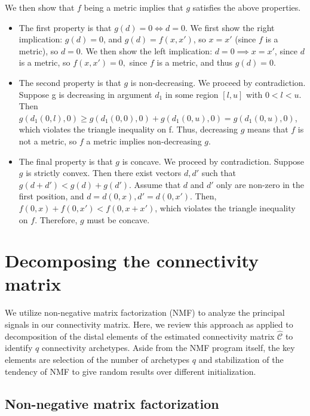 We then show that $f$ being a metric implies that $g$ satisfies the above properties.
\begin{itemize}
    \item The first property is that $g(d) = 0 \Longleftrightarrow d = 0$. We first show the right implication: $g(d) = 0$, and $g(d) = f(x,x')$, so $x = x'$ (since $f$ is a metric), so $d = 0$. We then show the left implication: $d = 0 \implies x = x'$, since $d$ is a metric, so $f(x,x') = 0,$ since $f$ is a metric, and thus $g(d) = 0$.
    \item The second property is that $g$ is non-decreasing. We proceed by contradiction.
    Suppose g is decreasing in argument $d_1$ in some region $[l, u]$ with $0 < l< u$.
    Then $g(d_1(0, l), 0) \geq g(d_1(0, 0), 0) + g(d_1(0, u), 0) = g(d_1(0, u),0)$, which violates the triangle inequality on f. Thus, decreasing $g$ means that $f$ is not a metric, so $f$ a metric implies non-decreasing $g$.
    \item The final property is that $g$ is concave. We proceed by contradiction. Suppose $g$ is strictly convex. Then there exist vectors $d, d'$ such that $g(d + d')  < g(d) + g(d')$.  Assume that $d$ and $d'$ only are non-zero in the first position, and $d = d(0, x), d' = d(0,x')$.  Then, $f(0,x) + f(0,x') <  f(0,x+ x')$, which violates the triangle inequality on $f$.  Therefore, $g$ must be concave.
\end{itemize}

\section{Decomposing the connectivity matrix}

We utilize non-negative matrix factorization (NMF) to analyze the principal signals in our connectivity matrix.
Here, we review this approach as applied to decomposition of the distal elements of the estimated connectivity matrix $\widehat {\mathcal C}$ to identify $q$ connectivity archetypes.
Aside from the NMF program itself, the key elements are selection of the number of archetypes $q$ and stabilization of the tendency of NMF to give random results over different initialization. 

\subsection{Non-negative matrix factorization}

